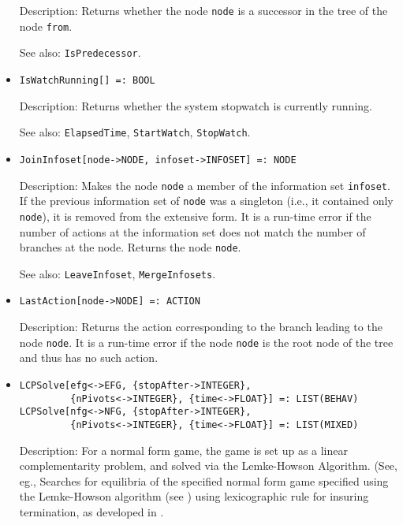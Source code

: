 \begin{itemize}
\bd
\item
[Description:] Returns whether the node \verb+node+ is a successor
in the tree of the node \verb+from+.
\item
[See also:] {\tt IsPredecessor}.
\ed

\item
\protect \large \begin{verbatim}
IsWatchRunning[] =: BOOL
\end{verbatim}\normalsize

\bd
\item
[Description:] Returns whether the system stopwatch is currently running.
\item
[See also:] {\tt ElapsedTime}, {\tt StartWatch}, {\tt StopWatch}.
\ed


\item
\protect \large \begin{verbatim}
JoinInfoset[node->NODE, infoset->INFOSET] =: NODE
\end{verbatim}\normalsize

\bd
\item
[Description:] Makes the node \verb+node+ a member of the information set
\verb+infoset+.  If the previous information set of \verb+node+ was
a singleton (i.e., it contained only \verb+node+), it is removed from the
extensive form.  It is a run-time error if the number of actions at the
information set does not match the number of branches at the node.
Returns the node \verb+node+.
\item
[See also:] {\tt LeaveInfoset}, {\tt MergeInfosets}.
\ed



\item
\protect \large \begin{verbatim} 
LastAction[node->NODE] =: ACTION
\end{verbatim}\normalsize

\bd
\item
[Description:] Returns the action corresponding to the branch leading to
the node \verb+node+.  It is a run-time error if the node \verb+node+ is
the root node of the tree and thus has no such action.
\ed

\item
\protect \large \begin{verbatim}
LCPSolve[efg<->EFG, {stopAfter->INTEGER},
         {nPivots<->INTEGER}, {time<->FLOAT}] =: LIST(BEHAV)
LCPSolve[nfg<->NFG, {stopAfter->INTEGER},
         {nPivots<->INTEGER}, {time<->FLOAT}] =: LIST(MIXED)
\end{verbatim}\normalsize
\bd
\item
[Description:] For a normal form game, the game is set up as a linear
complementarity problem, and solved via the Lemke-Howson Algorithm.
(See, eg., Searches for equilibria of the specified normal form game
specified using the Lemke-Howson algorithm (see
\cite[1964]{LemHow:64}) using lexicographic rule for insuring
termination, as developed in \cite[1971]{Eav:71}.


\end{itemize}
